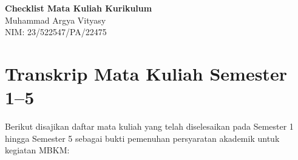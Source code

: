\documentclass[a4paper,12pt]{article}
\begin{document}
\begin{center}
    {\Large \textbf{Checklist Mata Kuliah Kurikulum}}\\[0.5em]
    {\large Muhammad Argya Vityasy}\\[0.3em]
    {\large NIM: 23/522547/PA/22475}\\[1.5em]
\end{center}

\section*{Transkrip Mata Kuliah Semester 1--5}

Berikut disajikan daftar mata kuliah yang telah diselesaikan pada Semester 1 hingga Semester 5 sebagai bukti pemenuhan persyaratan akademik untuk kegiatan MBKM:
\end{document}
